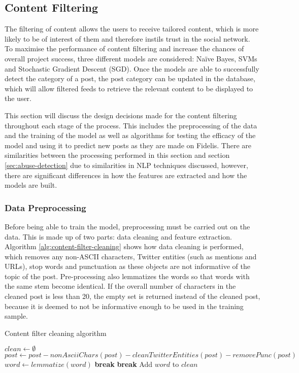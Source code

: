 \subsection{Content Filtering}
The filtering of content allows the users to receive tailored content, which is more likely to be of interest of them and therefore instils trust in the social network. To maximise the performance of content filtering and increase the chances of overall project success, three different models are considered: Na\"ive Bayes, SVMs and Stochastic Gradient Descent (SGD). Once the models are able to successfully detect the category of a post, the post category can be updated in the database, which will allow filtered feeds to retrieve the relevant content to be displayed to the user. 

This section will discuss the design decisions made for the content filtering throughout each stage of the process. This includes the preprocessing of the data and the training of the model as well as algorithms for testing the efficacy of the model and using it to predict new posts as they are made on Fidelis. There are similarities between the processing performed in this section and section \ref{sec:abuse-detection} due to similarities in NLP techniques discussed, however, there are significant differences in how the features are extracted and how the models are built.

\subsubsection{Data Preprocessing}
Before being able to train the model, preprocessing must be carried out on the data. This is made up of two parts: data cleaning and feature extraction. Algorithm \ref{alg:content-filter-cleaning} shows how data cleaning is performed, which removes any non-ASCII characters, Twitter entities (such as mentions and URLs), stop words and punctuation as these objects are not informative of the topic of the post. Pre-processing also lemmatizes the words so that words with the same stem become identical. If the overall number of characters in the cleaned post is less than 20, the empty set is returned instead of the cleaned post, because it is deemed to not be informative enough to be used in the training sample.

\begin{algorithm}[H]
\caption{Content filter cleaning algorithm}
\label{alg:content-filter-cleaning}
\begin{algorithmic}[1]
    \State $clean\gets \emptyset$
    \State $post\gets post - nonAsciiChars(post) - cleanTwitterEntities(post)- removePunc(post)$
        \State $word\gets lemmatize(word)$
            \State \textbf{break} 
        \EndIf
            \State \textbf{break} 
        \EndIf
        \State Add $word$ to $clean$
    \EndFor
        \State \Return{$\emptyset$}
    \Else
        \State {}
    \EndIf
\EndFunction
\end{algorithmic}
\end{algorithm}

